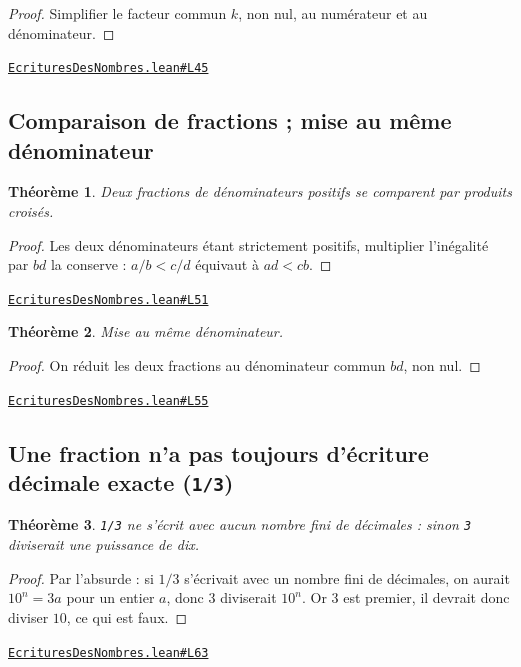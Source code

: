 \documentclass[11pt,a4paper]{article}
\theoremstyle{definition}
\theoremstyle{plain}
\newtheorem{theoreme}{Théorème}
\newcommand{\source}[2]{\par\smallskip\noindent\hfill{\footnotesize\href{#1}{\texttt{#2}}}\par\smallskip}
\begin{document}
\begin{proof}
Simplifier le facteur commun $k$, non nul, au numérateur et au dénominateur.
\end{proof}
\source{https://github.com/Commutator-IO/learn-lean/blob/main/cours/01-college/01-nombres-et-calculs/EcrituresDesNombres.lean\#L45}{EcrituresDesNombres.lean\#L45}

\subsection{Comparaison de fractions ; mise au même dénominateur}

\begin{theoreme}
Deux fractions de dénominateurs positifs se comparent par produits croisés.
\end{theoreme}

\begin{proof}
Les deux dénominateurs étant strictement positifs, multiplier l'inégalité par $bd$
la conserve : $a/b < c/d$ équivaut à $ad < cb$.
\end{proof}
\source{https://github.com/Commutator-IO/learn-lean/blob/main/cours/01-college/01-nombres-et-calculs/EcrituresDesNombres.lean\#L51}{EcrituresDesNombres.lean\#L51}

\begin{theoreme}
Mise au même dénominateur.
\end{theoreme}

\begin{proof}
On réduit les deux fractions au dénominateur commun $bd$, non nul.
\end{proof}
\source{https://github.com/Commutator-IO/learn-lean/blob/main/cours/01-college/01-nombres-et-calculs/EcrituresDesNombres.lean\#L55}{EcrituresDesNombres.lean\#L55}

\subsection{Une fraction n'a pas toujours d'écriture décimale exacte (\texttt{1/3})}

\begin{theoreme}
\texttt{1/3} ne s'écrit avec aucun nombre fini de décimales : sinon \texttt{3} diviserait une
puissance de dix.
\end{theoreme}

\begin{proof}
Par l'absurde : si $1/3$ s'écrivait avec un nombre fini de décimales, on aurait
$10^n = 3a$ pour un entier $a$, donc $3$ diviserait $10^n$. Or $3$ est premier, il devrait
donc diviser $10$, ce qui est faux.
\end{proof}
\source{https://github.com/Commutator-IO/learn-lean/blob/main/cours/01-college/01-nombres-et-calculs/EcrituresDesNombres.lean\#L63}{EcrituresDesNombres.lean\#L63}
\end{document}
